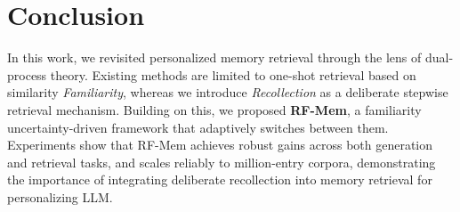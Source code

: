 \vspace{-5pt}
\section{Conclusion}
\vspace{-5pt}
In this work, we revisited personalized memory retrieval through the lens of dual-process theory. Existing methods are limited to one-shot retrieval based on similarity \emph{Familiarity}, whereas we introduce \emph{Recollection} as a deliberate stepwise retrieval mechanism. Building on this, we proposed \textbf{RF-Mem}, a familiarity uncertainty-driven framework that adaptively switches between them. Experiments show that RF-Mem achieves robust gains across both generation and retrieval tasks, and scales reliably to million-entry corpora, demonstrating the importance of integrating deliberate recollection into memory retrieval for personalizing LLM. 
